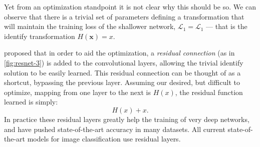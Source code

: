 \documentclass[thesis]{subfiles}
\begin{document}
Yet from an optimization standpoint it is not clear why this should be so. We can observe that there is a trivial set of parameters defining a transformation that will maintain the training loss of the shallower network, \ie $\mathcal{L}_1 = \mathcal{L}_1$ --- that is the identify transformation $H(\mathbf{x})=x$. 

\citet{He2015} proposed that in order to aid the optimization, a \emph{residual connection} (as in \cref{fig:resnet-3}) is added to the convolutional layers, allowing the trivial identify solution to be easily learned. This residual connection can be thought of as a shortcut, bypassing the previous layer. Assuming our desired, but difficult to optimize, mapping from one layer to the next is $H(x)$, the residual function learned is simply:
\begin{equation}
	H(x) + x.
\end{equation}
%
In practice these residual layers greatly help the training of very deep networks, and have pushed state-of-the-art accuracy in many datasets. All current state-of-the-art models for image classification use residual layers.



\end{document}
